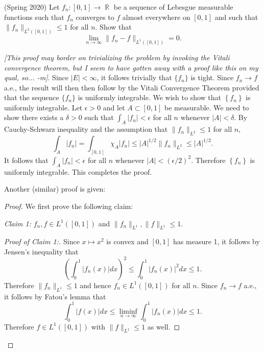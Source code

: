\documentclass[answers]{exam}
\DeclareMathOperator{\RR}{\mathbb{R}}
\begin{document}
\begin{questions}
\question (Spring 2020)
  Let $f_{n}:[0,1]\to \RR$ be a sequence of Lebesgue measurable functions such that $f_{n}$ converges to $f$ almost everywhere on $[0,1]$ and such that $\| f_{n} \|_{L^{2}([0,1])}\leq 1$ for all $n$. Show that
  \begin{equation*}
    \lim_{n \to \infty} \| f_{n}-f \|_{L^{1}([0,1])}=0.
  \end{equation*}

\begin{solution}
  
  \textit{[This proof may border on trivializing the problem by invoking the Vitali convergence theorem, but I seem to have gotten away with a proof like this on my qual, so... -m]}. Since $|E|<\infty$, it follows trivially that $\{f_{n}\}$ is tight. Since $f_{n}\to f$ a.e., the result will then then follow by the Vitali Convergence Theorem provided that the sequence $\{f_{n}\}$ is uniformly integrable.
  We wish to show that $\left\{ f_{n} \right\}$ is uniformly integrable. Let $\epsilon>0$ and let $A\subset [0,1]$ be measurable. We need to show there exists a $\delta>0$ such that $\int_{A}|f_{n}| <\epsilon$ for all $n$ whenever $|A|<\delta$. By Cauchy-Schwarz inequality and the assumption that $\| f_{n} \|_{L^{2}}\leq 1$ for all $n$,
  \begin{equation*}
    \int_{A}|f_{n}| = \int_{[0,1]}\chi_{A}|f_{n}| \leq |A|^{1/2}\| f_{n} \|_{L^{2}} \leq |A|^{1/2}.
  \end{equation*}
  It follows that $\int_{A}|f_{n}|<\epsilon $ for all $n$ whenever $|A|<(\epsilon/2)^{2}$. Therefore $\left\{ f_{n} \right\}$ is uniformly integrable. This completes the proof.


Another (similar) proof is given:
\begin{proof}

  We first prove the following claim:

  \noindent
  \textit{Claim 1:} $f_{n},f\in L^{1}([0,1])$ and $\| f_{n} \|_{L^{1}}, \| f \|_{L^{1}}\leq 1$.
  \begin{proof}[Proof of Claim 1:]
    Since $x\mapsto x^{2}$ is convex and $[0,1]$ has measure 1, it follows by Jensen's inequality that
    \begin{equation*}
      \left(\int_{0}^{1}|f_{n}(x)|dx\right)^{2}\leq \int_{0}^{1}|f_{n}(x)|^{2}dx\leq 1.
    \end{equation*}
    Therefore $\| f_{n} \|_{L^{1}}\leq 1$ and hence $f_{n}\in L^{1}([0,1])$ for all $n$. Since $f_{n}\to f$ a.e., it follows by Fatou's lemma that
    \begin{equation*}
      \int_{0}^{1}|f(x)|dx \leq \liminf_{n\to\infty}\int_{0}^{1}|f_{n}(x)|dx \leq 1.
    \end{equation*}
    Therefore $f\in L^{1}([0,1])$ with $\| f \|_{L^{1}}\leq 1$  as well.
  \end{proof}




\end{proof}
\end{solution}
\end{questions}
\end{document}
